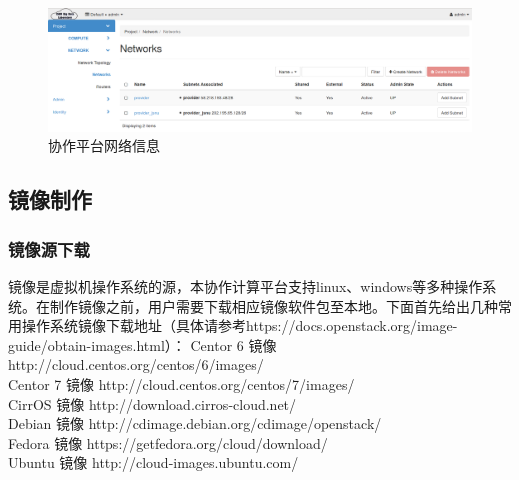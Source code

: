 \documentclass[12pt]{article}
\begin{document}
\begin{figure}[!htb]
\centering
\includegraphics[width=6in]{./figures/Project_Network_Networks}
\caption{协作平台网络信息}
\label{fig:projectnetworknetworks}
\end{figure}
\subsection{镜像制作}
\subsubsection{镜像源下载}
镜像是虚拟机操作系统的源，本协作计算平台支持linux、windows等多种操作系统。在制作镜像之前，用户需要下载相应镜像软件包至本地。下面首先给出几种常用操作系统镜像下载地址（具体请参考https://docs.openstack.org/image-guide/obtain-images.html）：
Centor 6 镜像 http://cloud.centos.org/centos/6/images/ \\
Centor 7 镜像 http://cloud.centos.org/centos/7/images/ \\
CirrOS 镜像 http://download.cirros-cloud.net/ \\
Debian 镜像 http://cdimage.debian.org/cdimage/openstack/ \\
Fedora 镜像 https://getfedora.org/cloud/download/ \\
Ubuntu 镜像 http://cloud-images.ubuntu.com/
\end{document}
